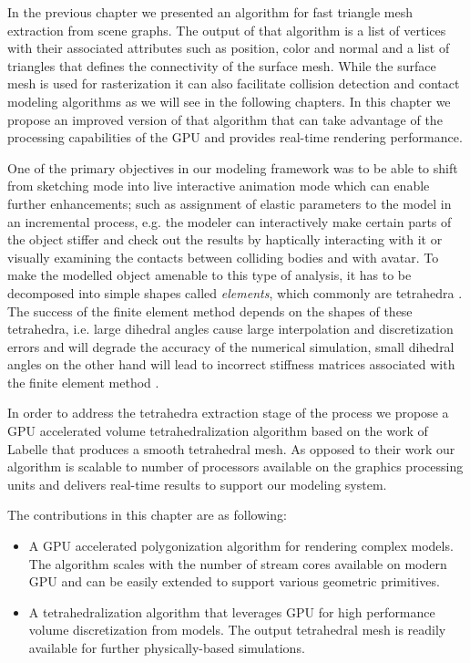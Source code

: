 \label{chapter:GPUDiscretization}
In the previous chapter we presented an algorithm for fast triangle mesh extraction from \blob scene graphs. The output of that 
algorithm is a list of vertices with their associated attributes such as position, color and normal and a list of triangles that
defines the connectivity of the surface mesh. While the surface mesh is used for rasterization it can also facilitate  
collision detection and contact modeling algorithms as we will see in the following chapters.  In this chapter we propose an improved 
version of that algorithm that can take advantage of the processing capabilities of the GPU and provides real-time \blob rendering performance. 



One of the primary objectives in our modeling framework was to be able to shift from sketching mode into live interactive animation mode
which can enable further enhancements; such as assignment of elastic parameters to the model in an incremental process, e.g. the
modeler can interactively make certain parts of the object stiffer and check out the results by haptically interacting with it or
visually examining the contacts between colliding bodies and with avatar. To make the modelled object amenable to this type of analysis, it has 
to be decomposed into simple shapes called \textit{elements}, which commonly are tetrahedra \cite{Labelle2007}. 
The success of the finite element method depends on the shapes of these tetrahedra, i.e. large dihedral angles cause large interpolation 
and discretization errors and will degrade the accuracy of the numerical simulation, small dihedral angles on the other hand will 
lead to incorrect stiffness matrices associated with the finite element method \cite{Shewchuk}. 


In order to address the tetrahedra extraction stage of the process we propose a GPU accelerated volume tetrahedralization algorithm based on the work of
Labelle \etal \cite{Labelle2007} that produces a smooth tetrahedral mesh. As opposed to their work our algorithm is scalable to number of processors 
available on the graphics processing units and delivers real-time results to support our modeling system.

The contributions in this chapter are as following:

\begin{itemize}
 \item A GPU accelerated polygonization algorithm for rendering complex \blob models. The algorithm scales with the number of stream cores available
 on modern GPU and can be easily extended to support various geometric primitives.
 
 \item A tetrahedralization algorithm that leverages GPU for high performance volume discretization from \blob models. The output tetrahedral mesh is
 readily available for further physically-based simulations.
\end{itemize}


